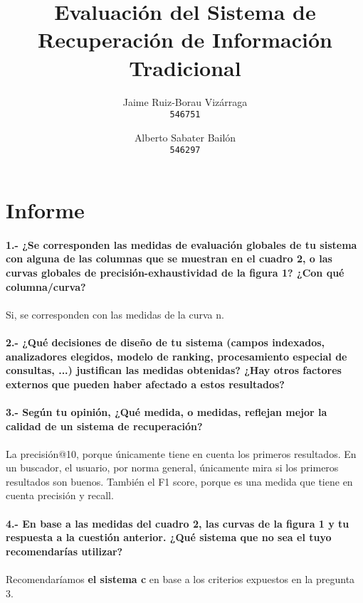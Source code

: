 \documentclass[a4paper]{article}
\begin{document}
\title{Evaluación del Sistema de Recuperación de Información Tradicional}
\author{
	Jaime Ruiz-Borau Vizárraga\\
	\texttt{546751}
	\and
	Alberto Sabater Bailón\\
	\texttt{546297}
	}
\date{}
\maketitle
\section{Informe}
\paragraph{1.- ¿Se corresponden las medidas de evaluación globales de tu sistema con alguna de las columnas que se muestran en el cuadro 2, o las curvas globales de precisión-exhaustividad de la figura 1? ¿Con qué columna/curva?}
\paragraph{}Si, se corresponden con las medidas de la curva n.
\paragraph{2.- ¿Qué decisiones de diseño de tu sistema (campos indexados, analizadores elegidos, modelo de ranking, procesamiento especial de consultas, ...) justifican las medidas obtenidas? ¿Hay otros factores externos que pueden haber afectado a estos resultados?}
\paragraph{}
\paragraph{3.- Según tu opinión, ¿Qué medida, o medidas, reflejan mejor la calidad de un sistema de recuperación?}
\paragraph{}La precisión@10, porque únicamente tiene en cuenta los primeros resultados. En un buscador, el usuario, por norma general, únicamente mira si los primeros resultados son buenos.
También el F1 score, porque es una medida que tiene en cuenta precisión y recall.
\paragraph{4.- En base a las medidas del cuadro 2, las curvas de la figura 1 y tu respuesta a la cuestión anterior. ¿Qué sistema que no sea el tuyo recomendarías utilizar?}
\paragraph{}Recomendaríamos \textbf{el sistema c} en base a los criterios expuestos en la pregunta 3.
\end{document}
